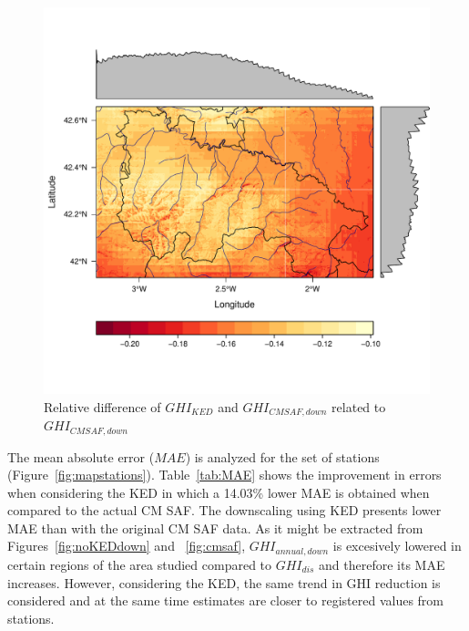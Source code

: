 \documentclass[article]{jss}
\begin{document}
\begin{figure}
  \centering
  \includegraphics[width=\textwidth]{figs/diffwithKED.pdf}
  \caption{Relative difference of $GHI_{KED}$ and $GHI_{CMSAF, down}$  related to $GHI_{CMSAF, down}$}
  \label{fig:diffKEDcmsaf}
\end{figure}


The mean absolute error ($MAE$) is analyzed for the set of
stations (Figure~\ref{fig:mapstations}). Table~\ref{tab:MAE} shows
the improvement in errors when considering the KED in which a 14.03\% lower MAE is obtained when compared to the actual CM SAF. The
downscaling using KED presents lower MAE than with the original CM
SAF data. As it might be extracted from
Figures~\ref{fig:noKEDdown} and ~\ref{fig:cmsaf}, $GHI_{annual,
  down}$ is excesively lowered in certain regions of the area
studied compared to $GHI_{dis}$ and therefore its MAE
increases. However, considering the KED, the same trend in GHI reduction is considered and at the same time
estimates are closer to registered values from stations.

\begin{CodeChunk}
\end{CodeChunk}
\end{document}
